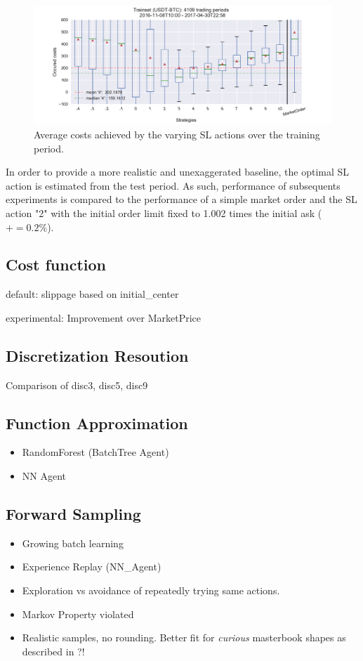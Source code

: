 \begin{figure}[ht]
        	\centering
        	\includegraphics[width=\textwidth]{content/drawings/bestActionTrain}
	\caption{Average costs achieved by the varying \ac{SL} actions over the training period.}
	\label{fig:bestAction}
\end{figure}

In order to provide a more realistic and unexaggerated baseline, the optimal \ac{SL} action is estimated from the test period. As such, performance of subsequents experiments is compared to the performance of a simple market order and the \ac{SL} action "2" with the initial order limit fixed to 1.002 times the initial ask ($+= 0.2\%$).


\subsection{Cost function}
default: slippage based on initial\_center

experimental: Improvement over MarketPrice

\subsection{Discretization Resoution}
\label{chap:experiments:discretization}
Comparison of disc3, disc5, disc9

\subsection{Function Approximation}
\begin{itemize}
\item RandomForest (BatchTree Agent)
\item NN Agent
\end{itemize}



\subsection{Forward Sampling}
\begin{itemize}
\item Growing batch learning
\item Experience Replay (NN\_Agent)
\item Exploration vs avoidance of repeatedly trying same actions.
\item Markov Property violated
\item Realistic samples, no rounding. Better fit for \emph{curious} masterbook shapes as described in ?!
\end{itemize}


